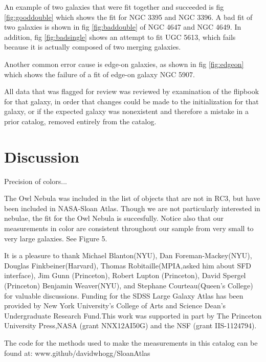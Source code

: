 \documentclass[12pt,preprint,pdftex]{aastex}
\begin{document}
An example of two galaxies that were fit together and succeeded is fig \ref{fig:gooddouble} which shows the fit for NGC 3395 and NGC 3396. A bad fit of two galaxies is shown in fig \ref{fig:baddouble} of NGC 4647 and NGC 4649. In addition, fig \ref{fig:badsingle} shows an attempt to fit UGC 5613, which fails because it is actually composed of two merging galaxies.

Another common error cause is edge-on galaxies, as shown in fig \ref{fig:edgeon} which shows the failure of a fit of edge-on galaxy NGC 5907. 

All data that was flagged for review was reviewed by examination of the flipbook for that galaxy, in order that changes could be made to the initialization for that galaxy, or if the expected galaxy was nonexistent and therefore a mistake in a prior catalog, removed entirely from the catalog. 

\section{Discussion}
Precision of colors...

The Owl Nebula was included in the list of objects that are not in RC3, but have been included in NASA-Sloan Atlas. Though we are not particularly interested in nebulae, the fit for the Owl Nebula is succesfully. Notice also that our measurements in color are consistent throughout our sample from very small to very large galaxies. See Figure 5. 


\acknowledgements It is a pleasure to thank 
Michael Blanton(NYU), 
Dan Foreman-Mackey(NYU), 
Douglas Finkbeiner(Harvard), 
Thomas Robitaille(MPIA,asked him about SFD interface), 
Jim Gunn (Princeton),
Robert Lupton (Princeton), 
David Spergel (Princeton)
Benjamin Weaver(NYU), and 
Stephane Courteau(Queen's College) 
for valuable discussions. Funding for the SDSS Large Galaxy Atlas has been provided by New York University's College of Arts and Science Dean's Undergraduate Research Fund.This work was supported in part by The Princeton University Press,NASA (grant NNX12AI50G) and the NSF (grant IIS-1124794).


The code for the methods used to make the measurements in this catalog can be found at: www.github/davidwhogg/SloanAtlas
\end{document}
